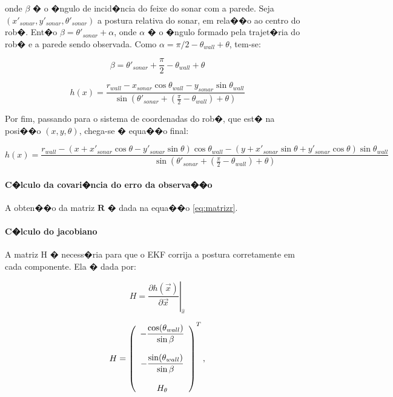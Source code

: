 onde $\beta$ � o �ngulo de incid�ncia do feixe do sonar com a parede. Seja $(x'_{sonar}, y'_{sonar}, \theta'_{sonar})$ a postura relativa do sonar, em rela��o ao centro do rob�. Ent�o $\beta = \theta'_{sonar} + \alpha$, onde $\alpha$ � o �ngulo formado pela trajet�ria do rob� e a parede sendo observada. Como $\alpha= \pi/2 - \theta_{wall} + \theta$, tem-se:

\begin{equation}
\beta=\theta'_{sonar}+ \frac{\pi}{2} - \theta_{wall} + \theta
\label{eq:beta}
\end{equation}

\begin{equation*}
h(x) = \frac{r_{wall} - x_{sonar}\cos \theta_{wall} - y_{sonar}\sin \theta_{wall}}{\sin(\theta'_{sonar} + (\frac{\pi}{2} - \theta_{wall}) + \theta)}
\end{equation*}

Por fim, passando para o sistema de coordenadas do rob�, que est� na posi��o $(x, y, \theta)$, chega-se � equa��o final:

\begin{equation}
h(x) = \frac{r_{wall} - (x + x'_{sonar} \cos \theta - y'_{sonar} \sin \theta)\cos \theta_{wall} - (y + x'_{sonar} \sin \theta + y'_{sonar} \cos \theta)\sin \theta_{wall}}{\sin(\theta'_{sonar} + (\frac{\pi}{2} - \theta_{wall}) + \theta)}
\label{eq:hx}
\end{equation}

\paragraph{C�lculo da covari�ncia do erro da observa��o} A obten��o da matriz $\bm{R}$ � dada na equa��o \ref{eq:matrizr}.

\paragraph{C�lculo do jacobiano} A matriz H � necess�ria para que o EKF corrija a postura corretamente em cada componente. Ela � dada por:

\begin{equation*}
H = \left. \frac{\partial h(\vec{x})}{\partial \vec{x}}\right|_{\hat{x}}
\end{equation*}

\begin{equation}
H = \left(
    \begin{array}{>{\displaystyle}c}
			-\frac{\cos(\theta_{wall})}{\sin\beta} \\
			\\
	  	-\frac{\sin(\theta_{wall})}{\sin\beta} \\
	  	\\
	  	H_\theta
		\end{array}
		\right)^T,
	\label{eq:matrizh}
\end{equation}

